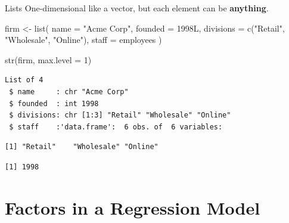 \documentclass[
  ignorenonframetext,
  aspectratio=169,
]{beamer}
\newenvironment{Shaded}{\begin{snugshade}}{\end{snugshade}}
\newcommand{\AttributeTok}[1]{\textcolor[rgb]{0.40,0.45,0.13}{#1}}
\newcommand{\DecValTok}[1]{\textcolor[rgb]{0.68,0.00,0.00}{#1}}
\newcommand{\FunctionTok}[1]{\textcolor[rgb]{0.28,0.35,0.67}{#1}}
\newcommand{\NormalTok}[1]{\textcolor[rgb]{0.00,0.23,0.31}{#1}}
\newcommand{\OtherTok}[1]{\textcolor[rgb]{0.00,0.23,0.31}{#1}}
\newcommand{\SpecialCharTok}[1]{\textcolor[rgb]{0.37,0.37,0.37}{#1}}
\newcommand{\StringTok}[1]{\textcolor[rgb]{0.13,0.47,0.30}{#1}}
\begin{document}
\begin{frame}[fragile]{Lists}
\protect\hypertarget{lists}{}
One-dimensional like a vector, but each element can be
\textbf{anything}.

\begin{Shaded}
\begin{Highlighting}[]
\NormalTok{firm }\OtherTok{\textless{}{-}} \FunctionTok{list}\NormalTok{(}
  \AttributeTok{name      =} \StringTok{"Acme Corp"}\NormalTok{,}
  \AttributeTok{founded   =}\NormalTok{ 1998L,}
  \AttributeTok{divisions =} \FunctionTok{c}\NormalTok{(}\StringTok{"Retail"}\NormalTok{, }\StringTok{"Wholesale"}\NormalTok{, }\StringTok{"Online"}\NormalTok{),}
  \AttributeTok{staff     =}\NormalTok{ employees}
\NormalTok{)}

\FunctionTok{str}\NormalTok{(firm, }\AttributeTok{max.level =} \DecValTok{1}\NormalTok{)}
\end{Highlighting}
\end{Shaded}

\begingroup\tiny\color{darkgray}

\begin{verbatim}
List of 4
 $ name     : chr "Acme Corp"
 $ founded  : int 1998
 $ divisions: chr [1:3] "Retail" "Wholesale" "Online"
 $ staff    :'data.frame':  6 obs. of  6 variables:
\end{verbatim}

\endgroup

\begin{Shaded}
\end{Shaded}

\begingroup\tiny\color{darkgray}

\begin{verbatim}
[1] "Retail"    "Wholesale" "Online"   
\end{verbatim}

\endgroup

\begingroup\tiny\color{darkgray}

\begin{verbatim}
[1] 1998
\end{verbatim}

\endgroup
\end{frame}

\hypertarget{sec-lm}{%
\section{Factors in a Regression Model}\label{sec-lm}}
\end{document}
